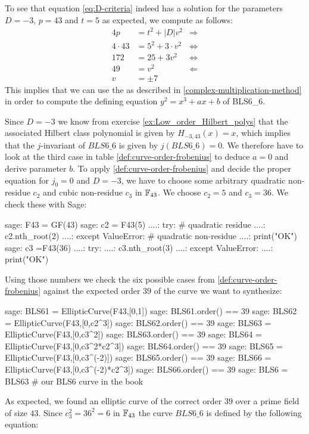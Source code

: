 To see that equation \ref{eq:D-criteria} indeed has a solution for the parameters $D=-3$, $p=43$ and $t=5$ as expected, we compute as follows:  
\begin{align*}
4p & = t^2 + |D|v^2 & \Rightarrow \\ 
4\cdot 43 & = 5^2 + 3\cdot v^2 & \Leftrightarrow \\ 
172 & = 25 + 3 v^2 & \Leftrightarrow \\ 
49 & = v^2 & \Leftarrow \\
v & = \pm 7
\end{align*}
This implies that we can use the  as described in \ref{complex-multiplication-method} in order to compute the defining equation $y^2=x^3 + ax + b$ of BLS6\_6. 

Since $D=-3$ we know from exercise \ref{ex:Low_order_Hilbert_polys} that the associated Hilbert class polynomial is given by $H_{-3,43}(x) = x$, which implies that the $j$-invariant of $BLS6\_6$ is given by $j(BLS6\_6)=0$. We therefore have to look at the third case in table \ref{def:curve-order-frobenius} to deduce $a=0$ and derive parameter $b$. To apply \ref{def:curve-order-frobenius} and decide the proper equation for $j_0=0$ and $D=-3$, we have to choose some arbitrary quadratic non-residue $c_2$ and cubic non-residue $c_3$ in $\mathbb{F}_{43}$. We choose $c_2 =5$ and $c_3=36$. We check these with Sage:
\begin{sagecommandline}
sage: F43 = GF(43)
sage: c2 = F43(5)
....: try: # quadratic residue
....:     c2.nth_root(2)
....: except ValueError: # quadratic non-residue
....:     print("OK") 
sage: c3 =F43(36)
....: try:
....:     c3.nth_root(3)
....: except ValueError:
....:     print("OK") 
\end{sagecommandline} 

Using those numbers we check the six possible cases from \ref{def:curve-order-frobenius} against the expected order $39$ of the curve we want to synthesize:

\begin{sagecommandline}
sage: BLS61 = EllipticCurve(F43,[0,1])
sage: BLS61.order() == 39
sage: BLS62 = EllipticCurve(F43,[0,c2^3])
sage: BLS62.order() == 39
sage: BLS63 = EllipticCurve(F43,[0,c3^2])
sage: BLS63.order() == 39
sage: BLS64 = EllipticCurve(F43,[0,c3^2*c2^3])
sage: BLS64.order() == 39
sage: BLS65 = EllipticCurve(F43,[0,c3^(-2)])
sage: BLS65.order() == 39
sage: BLS66 = EllipticCurve(F43,[0,c3^(-2)*c2^3])
sage: BLS66.order() == 39
sage: BLS6 = BLS63 # our BLS6 curve in the book
\end{sagecommandline}
As expected, we found an elliptic curve of the correct order $39$ over a prime field of size $43$. Since $c_3^2=36^2=6$ in $\mathbb{F}_{43}$ the curve $BLS6\_6$ is defined by the following equation:

